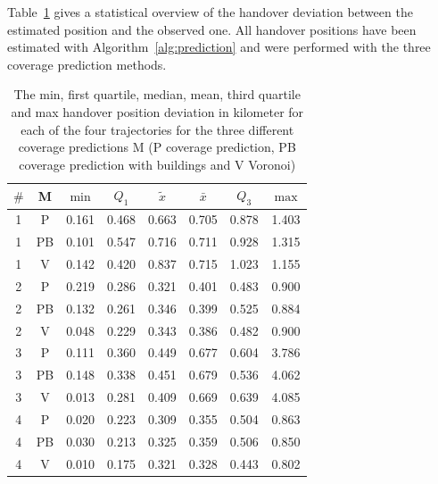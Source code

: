 Table~\ref{table:handover} gives a statistical overview of the handover deviation between the estimated position and the observed one. All handover positions have been estimated with Algorithm~\ref{alg:prediction} and were performed with the three coverage prediction methods. 
	\begin{table}[h]
		\caption{The min, first quartile, median, mean, third quartile and max handover position deviation in kilometer for each of the four trajectories for the three different coverage predictions M (P coverage prediction, PB coverage prediction with buildings and V Voronoi)}
		\begin{tabular}{|c|c|c|c|c|c|c|c|}
			\hline
			\textbf{$\#$} & \textbf{M} & \textbf{$\min$} & \textbf{$Q_1$} & \textbf{$\tilde{x}$} & \textbf{$\bar{x}$} & \textbf{$Q_3$} & \textbf{$\max$} \\ \hline
			1             & P          & 0.161           & 0.468          & 0.663                & 0.705              & 0.878          & 1.403           \\ \hline
			1             & PB         & 0.101           & 0.547          & 0.716                & 0.711              & 0.928          & 1.315           \\ \hline
			1             & V          & 0.142           & 0.420          & 0.837                & 0.715              & 1.023          & 1.155           \\ \hline
			2             & P          & 0.219           & 0.286          & 0.321                & 0.401              & 0.483          & 0.900           \\ \hline
			2             & PB         & 0.132           & 0.261          & 0.346                & 0.399              & 0.525          & 0.884           \\ \hline
			2             & V          & 0.048           & 0.229          & 0.343                & 0.386              & 0.482          & 0.900           \\ \hline
			3             & P          & 0.111           & 0.360          & 0.449                & 0.677              & 0.604          & 3.786           \\ \hline
			3             & PB         & 0.148           & 0.338          & 0.451                & 0.679              & 0.536          & 4.062           \\ \hline
			3             & V          & 0.013           & 0.281          & 0.409                & 0.669              & 0.639          & 4.085           \\ \hline
			4             & P          & 0.020           & 0.223          & 0.309                & 0.355              & 0.504          & 0.863           \\ \hline
			4             & PB         & 0.030           & 0.213          & 0.325                & 0.359              & 0.506          & 0.850           \\ \hline
			4             & V          & 0.010           & 0.175          & 0.321                & 0.328              & 0.443          & 0.802           \\ \hline
		\end{tabular}
		\label{table:handover}
	\end{table}
